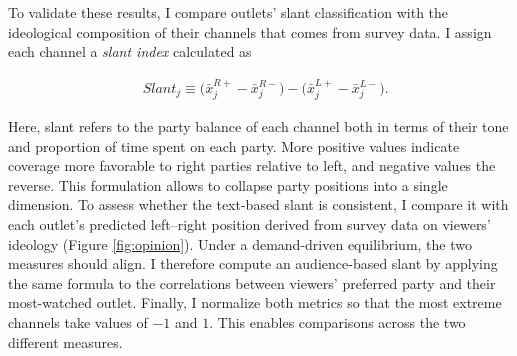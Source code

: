 \documentclass[12pt]{article}
\begin{document}
	
	
	
	
	
	To validate these results, I compare outlets' slant classification with the ideological composition of their channels that comes from survey data. 	I assign each channel a \textit{slant index} calculated as 
	
	
	
	\begin{equation}\label{eq:ideo_index}
		\begin{aligned}
			& Slant_j \equiv \bigl(\bar{x}_j^{R+}-\bar{x}_j^{R-}\bigr)-\bigl(\bar{x}_j^{L+}-\bar{x}_j^{L-}\bigr).
		\end{aligned}
	\end{equation} 


 
 Here, slant refers to the party balance of each channel both in terms of their tone and proportion of time spent on each party. More positive values indicate coverage more favorable to right parties relative to left,  and negative values the reverse. This formulation allows to collapse party positions into a single dimension.  To assess whether the text-based slant is consistent, I compare it with each outlet’s predicted left–right position derived from survey data on viewers’ ideology (Figure \ref{fig:opinion}). Under a demand-driven equilibrium, the two measures should align. I therefore compute an audience-based slant by applying the same formula to the correlations between viewers’ preferred party and their most-watched outlet. Finally, I  normalize both metrics so that the most extreme channels take values of $-1$ and $1$. This enables comparisons across the two different measures.
 
\end{document}
